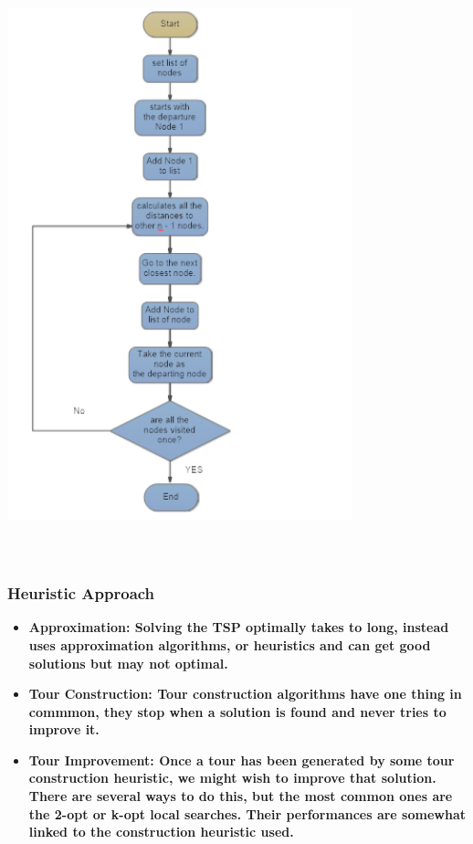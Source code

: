 \documentclass[12pt]{article}
\newcounter{subsubsubsection}[subsubsection]
\begin{document}
\begin{center}
	\includegraphics[width=10cm,height=17cm]{./assets/flowchart/greedy.png}\\
\end{center}

\subsubsection{ Heuristic Approach }
\begin{itemize}
\item \bf{Approximation}: 
Solving the TSP optimally takes to long, instead uses approximation algorithms, or heuristics and can get good solutions but may not optimal.
\item \bf{Tour Construction}:
Tour construction algorithms have one thing in commmon,
they stop when a solution is found and never
tries to improve it.
\item \bf{Tour Improvement}:
Once a tour has been generated by some tour construction
heuristic, we might wish to improve that solution.
There are several ways to do this, but the most
common ones are the 2-opt or k-opt local searches.
Their performances are somewhat linked to the construction
heuristic used.
\end{itemize}
\end{document}
